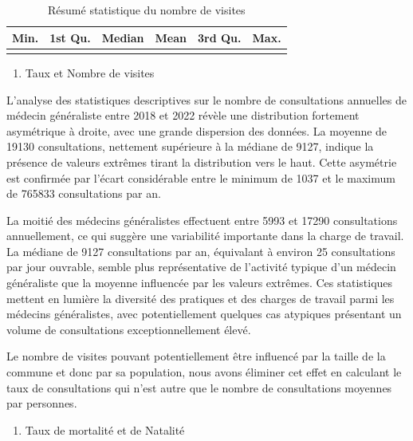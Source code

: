 \documentclass[
]{article}
\providecommand{\tightlist}{%
  \setlength{\itemsep}{0pt}\setlength{\parskip}{0pt}}
\begin{document}
\begin{table}[H]
\centering
\caption{\label{tab:unnamed-chunk-4}Résumé statistique du nombre de visites}
\centering
\begin{tabular}[t]{rrrrrr}
\toprule
Min. & 1st Qu. & Median & Mean & 3rd Qu. & Max.\\
\midrule
\cellcolor{gray!10}{1037} & \cellcolor{gray!10}{5993} & \cellcolor{gray!10}{9127} & \cellcolor{gray!10}{19129.63} & \cellcolor{gray!10}{17290} & \cellcolor{gray!10}{765833}\\
\bottomrule
\end{tabular}
\end{table}

\begin{enumerate}
\def\labelenumi{\arabic{enumi}.}
\tightlist
\item
  Taux et Nombre de visites
\end{enumerate}

L'analyse des statistiques descriptives sur le nombre de consultations
annuelles de médecin généraliste entre 2018 et 2022 révèle une
distribution fortement asymétrique à droite, avec une grande dispersion
des données. La moyenne de 19130 consultations, nettement supérieure à
la médiane de 9127, indique la présence de valeurs extrêmes tirant la
distribution vers le haut. Cette asymétrie est confirmée par l'écart
considérable entre le minimum de 1037 et le maximum de 765833
consultations par an.

La moitié des médecins généralistes effectuent entre 5993 et 17290
consultations annuellement, ce qui suggère une variabilité importante
dans la charge de travail. La médiane de 9127 consultations par an,
équivalant à environ 25 consultations par jour ouvrable, semble plus
représentative de l'activité typique d'un médecin généraliste que la
moyenne influencée par les valeurs extrêmes. Ces statistiques mettent en
lumière la diversité des pratiques et des charges de travail parmi les
médecins généralistes, avec potentiellement quelques cas atypiques
présentant un volume de consultations exceptionnellement élevé.

Le nombre de visites pouvant potentiellement être influencé par la
taille de la commune et donc par sa population, nous avons éliminer cet
effet en calculant le taux de consultations qui n'est autre que le
nombre de consultations moyennes par personnes.

\begin{enumerate}
\def\labelenumi{\arabic{enumi}.}
\setcounter{enumi}{1}
\tightlist
\item
  Taux de mortalité et de Natalité
\end{enumerate}
\end{document}
